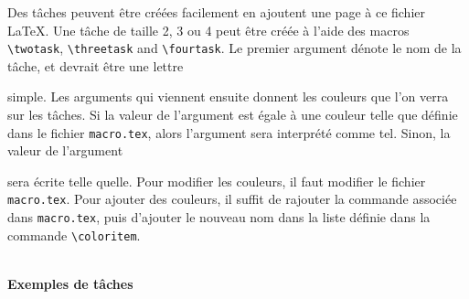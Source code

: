 \documentclass{article}
\begin{document}
\begin{minipage}[b]{0.30\textwidth}  
        Des tâches peuvent être créées facilement en ajoutent une page à ce fichier LaTeX. Une tâche de taille 2, 3 ou 4 peut être créée à l'aide des macros \lstinline|\twotask|, \lstinline|\threetask| and \lstinline|\fourtask|. Le premier argument dénote le nom de la tâche, et devrait être une lettre
\end{minipage}
\hfill
\begin{minipage}[b]{0.30\textwidth}
    simple. Les arguments qui viennent ensuite donnent les couleurs que l'on verra sur les tâches. Si la valeur de l'argument est égale à une couleur telle que définie dans le fichier \lstinline|macro.tex|, alors l'argument sera interprété comme tel. Sinon, la valeur de l'argument
\end{minipage}
\hfill
\begin{minipage}[b]{0.30\textwidth}
        sera écrite telle quelle. Pour modifier les couleurs, il faut modifier le fichier \lstinline|macro.tex|. Pour ajouter des couleurs, il suffit de rajouter la commande associée dans \lstinline|macro.tex|, puis d'ajouter le nouveau nom dans la liste définie dans la commande \lstinline|\coloritem|.
\end{minipage}\\

{\large\textbf{Exemples de tâches}}
\vspace{5mm}

        
       
        
         \\
        
        
\end{document}
